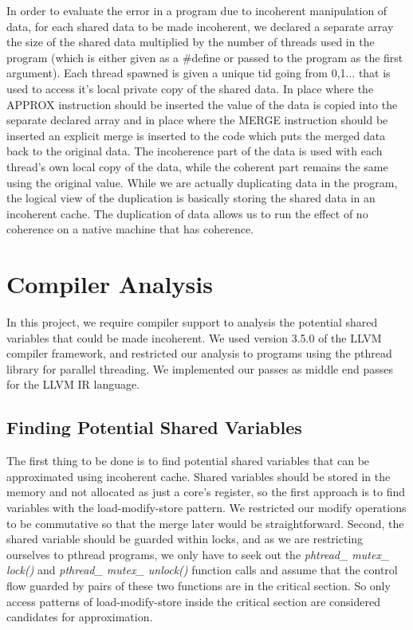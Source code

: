 \documentclass[12pt,conference]{IEEEtran}
\begin{document}
In order to evaluate the error in a program due to incoherent 
manipulation of data, for each shared data to be made incoherent,
we declared a separate array the size of the shared data multiplied
by the number of threads used in the program (which is either given
as a \#define or passed to the program as the first argument). Each 
thread spawned is given a unique tid going from 0,1... that is used
to access it's local private copy of the shared data. In place where
the APPROX instruction should be inserted the value of the data is
copied into the separate declared array and in place where the MERGE
instruction should be inserted an explicit merge is inserted to the
code which puts the merged data back to the original data. The 
incoherence part of the data is used with each thread's own local
copy of the data, while the coherent part remains the same using
the original value. While we are actually duplicating data in 
the program, the logical view of the duplication is basically
storing the shared data in an incoherent cache. The duplication of data
allows us to run the effect of no coherence on a native machine
that has coherence.

\section{Compiler Analysis}

In this project, we require compiler support to analysis the potential
shared variables that could be made incoherent. We used version 3.5.0
of the LLVM compiler framework\cite{llvm}, and restricted our analysis
to programs using the pthread library for parallel threading.
We implemented our passes as middle end passes for the LLVM IR language.

\subsection{Finding Potential Shared Variables}

The first thing to be done is to find potential shared variables that
can be approximated using incoherent cache. Shared variables should be
stored in the memory and not allocated as just a core's register, so 
the first approach is to find variables with the load-modify-store
pattern. We restricted our modify operations to be commutative so that
the merge later would be straightforward. Second, the shared variable
should be guarded within locks, and as we are restricting ourselves to
pthread programs, we only have to seek out the 
\textit{phtread\_ mutex\_ lock()} and \textit{pthread\_ mutex\_ unlock()} 
function calls and assume that the control flow guarded by pairs of
these two functions are in the critical section. So only access patterns
of load-modify-store inside the critical section are considered candidates
for approximation.
\end{document}
